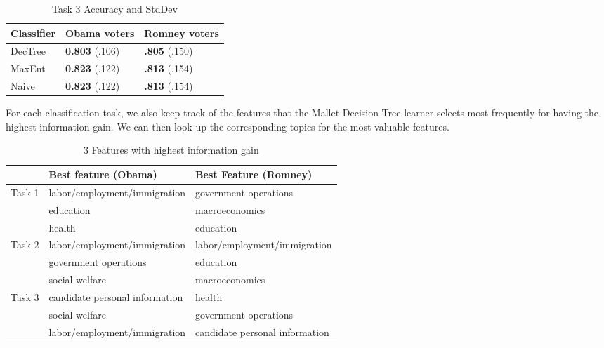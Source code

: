 \begin{table}[H]
\begin{centering}
\begin{tabular}{ l | l | l }
Classifier & Obama voters & Romney voters \\
\hline
DecTree & \textbf{0.803} (.106) &  \textbf{.805} (.150) \\
MaxEnt & \textbf{0.823} (.122) &  \textbf{.813} (.154) \\
Naive & \textbf{0.823} (.122) &  \textbf{.813} (.154) \\
\end{tabular}
\caption{Task 3 Accuracy and StdDev}
\label{tab:task3boydstun}
\end{centering}
\end{table}

For each classification task, we also keep track of the features that the Mallet Decision Tree learner selects most frequently for having the highest information gain. We can then look up the corresponding topics for the most valuable features.

\begin{table*}[H]
\begin{centering}
\begin{tabular}{| l | l | l |}
\hline
  & Best feature (Obama) & Best Feature (Romney) \\
\hline
Task 1 & labor/employment/immigration & government operations \\
	    & education & macroeconomics \\
	    & health & education \\
	    \hline
Task 2 & labor/employment/immigration & labor/employment/immigration \\
	    & government operations & education \\
	    & social welfare & macroeconomics  \\
	    \hline
Task 3 & candidate personal information & health \\
	    & social welfare & government operations \\
	    & labor/employment/immigration & candidate personal information \\
	    \hline
\end{tabular}
\caption{3 Features with highest information gain}
\end{centering}
\end{table*}

